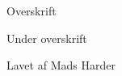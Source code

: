 \documentclass[12pt, a4paper]{article}
\begin{document}
\begin{titlepage}
	\begin{center}
		{\huge Overskrift}\\

		\vspace{0.5cm}

		{\large Under overskrift}\\

		\vspace{0.2cm}

		Lavet af Mads Harder

		\vspace{4cm}

	\end{center}
\end{titlepage}
\newpage

\thispagestyle{empty}
\renewcommand{\contentsname}{Indholdsfortegnelse}
\tableofcontents

\newpage
\setcounter{page}{1}



\newpage
{}
\renewcommand{\refname}{Litteraturliste}


\end{document}
